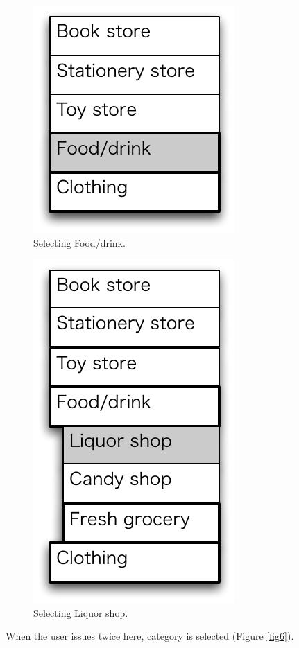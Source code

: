 \documentclass[conference]{IEEEtran}
\def\down{\tsf{▼}}
\begin{document}
\begin{figure}[H]
\centerline{\includegraphics[width=\menuwidth,bb=0 0 139 157]{figures/fig4.pdf}}
\caption{Selecting Food/drink.}
\label{fig4}
\end{figure}

\begin{figure}[H]
\centerline{\includegraphics[width=\menuwidth,bb=0 0 139 238]{figures/fig5.pdf}}
\caption{Selecting Liquor shop.}
\label{fig5}
\end{figure}

When the user issues {\down} twice here,
 category is selected (Figure \ref{fig6}).
\end{document}
